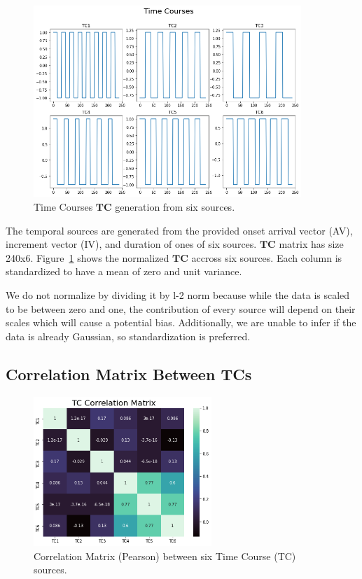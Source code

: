 \documentclass[11pt]{article}
\begin{document}
\begin{figure}[H]
    \begin{center}
       \includegraphics[width=0.9\textwidth]{../plots/1_1_TC}
      \caption{Time Courses $\mathbf{TC}$ generation from six sources.}
      \label{fig:time_courses}
    \end{center}
  \end{figure}

The temporal sources are generated from the provided onset arrival vector (AV), increment vector (IV), and duration of ones of six sources. $\mathbf{TC}$ matrix has size 240x6. Figure~\ref{fig:time_courses} shows the normalized $\mathbf{TC}$ accross six sources. Each column is standardized to have a mean of zero and unit variance.

We do not normalize by dividing it by l-2 norm because while the data is scaled to be between zero and one, the contribution of every source will depend on their scales which will cause a potential bias. Additionally, we are unable to infer if the data is already Gaussian, so standardization is preferred.

\subsection{Correlation Matrix Between TCs}

\begin{figure}[H]
    \begin{center}
       \includegraphics[width=0.6\textwidth]{../plots/1_2_correlationmatrix}
      \caption{Correlation Matrix (Pearson) between six Time Course (TC) sources.}
      \label{fig:TC_CM}
    \end{center}
  \end{figure}
\end{document}
